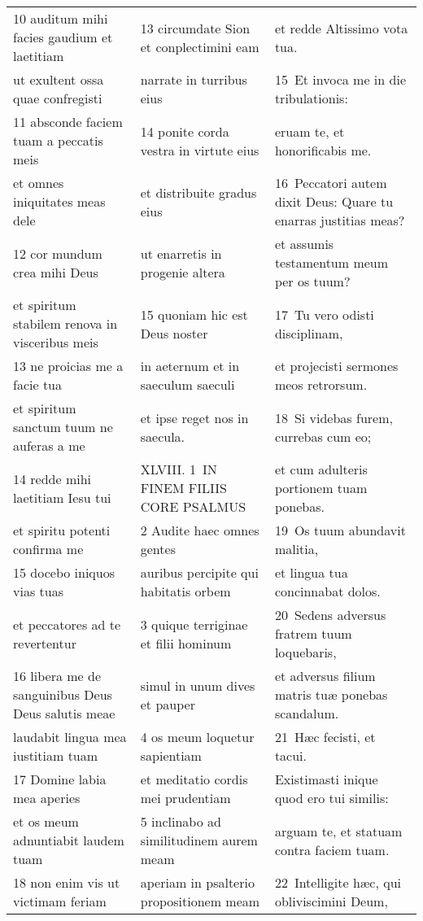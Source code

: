\documentclass{article}
\begin{document}
\begin{longtable}{@{}p{}p{}p{}@{}}
10 auditum mihi facies gaudium et laetitiam	&	13 circumdate Sion et conplectimini eam	&	et redde Altissimo vota tua.	\\
ut exultent ossa quae confregisti	&	narrate in turribus eius	&	15 Et invoca me in die tribulationis:	\\
11 absconde faciem tuam a peccatis meis	&	14 ponite corda vestra in virtute eius	&	eruam te, et honorificabis me.	\\
et omnes iniquitates meas dele	&	et distribuite gradus eius	&	16 Peccatori autem dixit Deus: Quare tu enarras justitias meas?	\\
12 cor mundum crea mihi Deus	&	ut enarretis in progenie altera	&	et assumis testamentum meum per os tuum?	\\
et spiritum stabilem renova in visceribus meis	&	15 quoniam hic est Deus noster	&	17 Tu vero odisti disciplinam,	\\
13 ne proicias me a facie tua	&	in aeternum et in saeculum saeculi	&	et projecisti sermones meos retrorsum.	\\
et spiritum sanctum tuum ne auferas a me	&	et ipse reget nos in saecula.	&	18 Si videbas furem, currebas cum eo;	\\
14 redde mihi laetitiam Iesu tui	&	XLVIII. 1 IN FINEM FILIIS CORE PSALMUS	&	et cum adulteris portionem tuam ponebas.	\\
et spiritu potenti confirma me	&	2 Audite haec omnes gentes	&	19 Os tuum abundavit malitia,	\\
15 docebo iniquos vias tuas	&	auribus percipite qui habitatis orbem	&	et lingua tua concinnabat dolos.	\\
et peccatores ad te revertentur	&	3 quique terriginae et filii hominum	&	20 Sedens adversus fratrem tuum loquebaris,	\\
16 libera me de sanguinibus Deus Deus salutis meae	&	simul in unum dives et pauper	&	et adversus filium matris tuæ ponebas scandalum.	\\
laudabit lingua mea iustitiam tuam	&	4 os meum loquetur sapientiam	&	21 Hæc fecisti, et tacui.	\\
17 Domine labia mea aperies	&	et meditatio cordis mei prudentiam	&	Existimasti inique quod ero tui similis:	\\
et os meum adnuntiabit laudem tuam	&	5 inclinabo ad similitudinem aurem meam	&	arguam te, et statuam contra faciem tuam.	\\
18 non enim vis ut victimam feriam	&	aperiam in psalterio propositionem meam	&	22 Intelligite hæc, qui obliviscimini Deum,	\\

\end{longtable}
\end{document}

